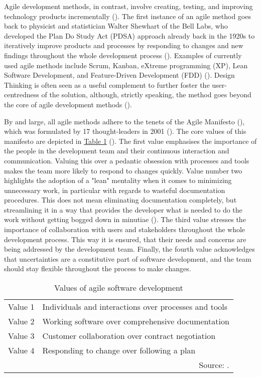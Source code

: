  \par 
Agile development methods, in contrast, involve creating, testing, and improving technology products incrementally (\cite{Mergel2016}). The first instance of an agile method goes back to physicist and statistician Walter Shewhart of the Bell Labs, who developed the Plan Do Study Act (PDSA) approach already back in the 1920s to iteratively improve products and processes by responding to changes and new findings throughout the whole development process (\cite{Goldman1994}). Examples of currently used agile methods include Scrum, Kanban, eXtreme programming (XP), Lean Software Development, and Feature-Driven Development (FDD) (\cite{Dingsoyr2012, Rigby2016a}). Design Thinking is often seen as a useful complement to further foster the user-centredness of the solution, although, strictly speaking, the method goes beyond the core of agile development methods (\cite{DaSilva2011, AustralianDigitalTransformationAgency2019}).\par  
By and large, all agile methods adhere to the tenets of the Agile Manifesto (\cite*{AgileManifesto2001}), which was formulated by 17 thought-leaders in 2001 (\cite{Rigby2016a}). The core values of this manifesto are depicted in \hyperref[tab: Values of agile software development]{Table 1} (\cite{Dingsoyr2012}). The first value emphasises the importance of the people in the development team and their continuous interaction and communication. Valuing this over a pedantic obsession with processes and tools makes the team more likely to respond to changes quickly. Value number two highlights the adoption of a "lean" mentality when it comes to minimizing unnecessary work, in particular with regards to wasteful documentation procedures. This does not mean eliminating documentation completely, but streamlining it in a way that provides the developer what is needed to do the work without getting bogged down in minutiae (\cite{Eby2016}). The third value stresses the importance of collaboration with users and stakeholders throughout the whole development process. This way it is ensured, that their needs and concerns are being addressed by the development team. Finally, the fourth value acknowledges that uncertainties are a constitutive part of software development, and the team should stay flexible throughout the process to make changes.\par
%
\begin{table}[ht!]
	\centering
	\caption{Values of agile software development}\label{tab: Values of agile software development}
	\renewcommand{\arraystretch}{1.4}
	\begin{tabular}{ p{1.5cm} p{9.5cm} }
		\hline
		Value 1 & Individuals and interactions over processes and tools\\
		Value 2 & Working software over comprehensive documentation\\
		Value 3 & Customer collaboration over contract negotiation\\
		Value 4 & Responding to change over following a plan\\
		\hline
		\multicolumn{2}{r}{Source: \cite{AgileManifesto2001}.}	
	\end{tabular}
\end{table}
